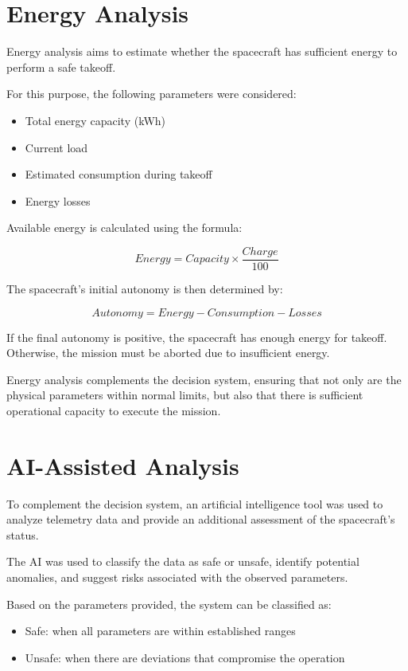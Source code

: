 \documentclass[12pt]{article}
\begin{document}
\section{Energy Analysis}

Energy analysis aims to estimate whether the spacecraft has sufficient energy to perform a safe takeoff.

For this purpose, the following parameters were considered:

\begin{itemize}
    \item Total energy capacity (kWh)
    \item Current load
    \item Estimated consumption during takeoff
    \item Energy losses
\end{itemize}

Available energy is calculated using the formula:

\[
Energy = Capacity \times \frac{Charge}{100}
\]

The spacecraft's initial autonomy is then determined by:

\[
Autonomy = Energy - Consumption - Losses
\]

If the final autonomy is positive, the spacecraft has enough energy for takeoff. Otherwise, the mission must be aborted due to insufficient energy.

Energy analysis complements the decision system, ensuring that not only are the physical parameters within normal limits, but also that there is sufficient operational capacity to execute the mission.

\section{AI-Assisted Analysis}

To complement the decision system, an artificial intelligence tool was used to analyze telemetry data and provide an additional assessment of the spacecraft's status.

The AI was used to classify the data as safe or unsafe, identify potential anomalies, and suggest risks associated with the observed parameters.

Based on the parameters provided, the system can be classified as:

\begin{itemize}
    \item Safe: when all parameters are within established ranges
    \item Unsafe: when there are deviations that compromise the operation
\end{itemize}
\end{document}
